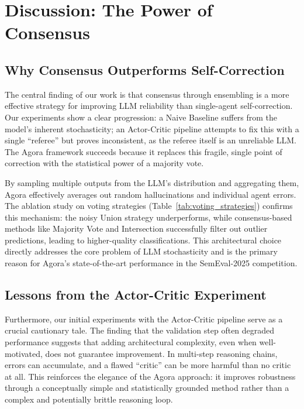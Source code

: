 \section{Discussion: The Power of Consensus}

\subsection{Why Consensus Outperforms Self-Correction}

The central finding of our work is that consensus through ensembling is a more effective strategy for improving LLM reliability than single-agent self-correction. Our experiments show a clear progression: a Naive Baseline suffers from the model's inherent stochasticity; an Actor-Critic pipeline attempts to fix this with a single ``referee'' but proves inconsistent, as the referee itself is an unreliable LLM. The Agora framework succeeds because it replaces this fragile, single point of correction with the statistical power of a majority vote.

By sampling multiple outputs from the LLM's distribution and aggregating them, Agora effectively averages out random hallucinations and individual agent errors. The ablation study on voting strategies (Table~\ref{tab:voting_strategies}) confirms this mechanism: the noisy Union strategy underperforms, while consensus-based methods like Majority Vote and Intersection successfully filter out outlier predictions, leading to higher-quality classifications. This architectural choice directly addresses the core problem of LLM stochasticity and is the primary reason for Agora's state-of-the-art performance in the SemEval-2025 competition.

\subsection{Lessons from the Actor-Critic Experiment}

Furthermore, our initial experiments with the Actor-Critic pipeline serve as a crucial cautionary tale. The finding that the validation step often degraded performance suggests that adding architectural complexity, even when well-motivated, does not guarantee improvement. In multi-step reasoning chains, errors can accumulate, and a flawed ``critic'' can be more harmful than no critic at all. This reinforces the elegance of the Agora approach: it improves robustness through a conceptually simple and statistically grounded method rather than a complex and potentially brittle reasoning loop.